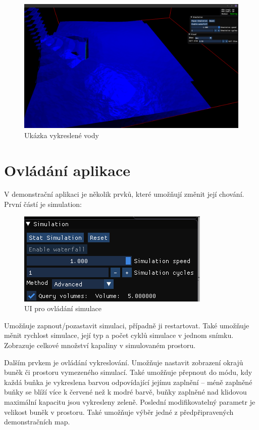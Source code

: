 \documentclass[12pt,a4paper,titlepage,final]{report}
\begin{document}
\begin{figure}[H]
    \centering
    \includegraphics[scale=1.5]{images/render.png}
    \caption{Ukázka vykreslené vody}
    \label{fig:render}
\end{figure}

\section{Ovládání aplikace}
V demonstrační aplikaci je několik prvků, které umožňují změnit její chování. První částí je simulation:

\begin{figure}[H]
    \centering
    \includegraphics[scale=2]{images/sim.png}
    \caption{UI pro ovládání simulace}
    \label{fig:simui}
\end{figure}

Umožňuje zapnout/pozastavit simulaci, případně ji restartovat. Také umožňuje měnit rychlost simulace, její typ a počet cyklů simulace v jednom snímku. Zobrazuje celkové množství kapaliny v simulovaném prostoru.

Dalším prvkem je ovládání vykreslování. Umožňuje nastavit zobrazení okrajů buněk či prostoru vymezeného simulací. Také umožňuje přepnout do módu, kdy každá buňka je vykreslena barvou odpovídající jejímu zaplnění -- méně zaplněné buňky se blíží více k červené než k modré barvě, buňky zaplněné nad klidovou maximální kapacitu jsou vykresleny zeleně. Poslední modifikovatelný parametr je velikost buněk v prostoru. Také umožňuje výběr jedné z předpřipravených demonstračních map.
\end{document}
